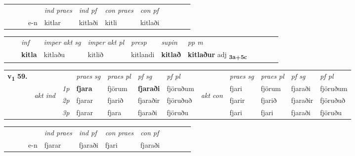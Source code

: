\begin{tabular}{llllllllllll}
 & &  & &  \textit{ind praes} & \textit{ind pf} & \textit{con praes} & \textit{con pf} \\*
&  & & e-n & kitlar & kitlaði & kitli & kitlaði \\*
\cmidrule{5-9}
\end{tabular}


\begin{tabular}{llllllllllll}
 & & \textit{inf} & \textit{imper akt sg} & \textit{imper akt pl}   & \textit{presp} & \textit{supin}  & \textit{pp m}     \\*
  & & \textbf{kitla} & kitlaðu  & kitlið   & kitlandi &  \textbf{kitlað}  & \textbf{kitlaður} adj \textbf{\textsubscript{3a+5c}} \\*
\cmidrule{1-12}
\end{tabular}



\begin{tabular}{llllllllllll} \toprule
\multirow{4}{*}{{{\textbf{v{\textsubscript{1}}} \Large{\textbf{59.}}}}}  & &   &  \textit{praes sg}  & \textit{praes pl}  &\textit{ pf sg} & \textit{pf pl} &  &  \textit{praes sg}  & \textit{praes pl}  & \textit{pf sg} & \textit{pf pl } \\*
	\cmidrule{4-7} \cmidrule{9-12}
 & \multirow{3}{*}{\begin{turn}{90}\textit{akt ind}\end{turn}} & {\textit{1p}} & \textbf{fjara} & fjörum    & \textbf{fjaraði} & fjöruðum & \multirow{3}{*}{\begin{turn}{90}\textit{akt con}\end{turn}} &fjari & fjörum & fjaraði & fjöruðum\\*
& &  {\textit{2p}} &  fjarar  & fjarið   & fjaraðir & fjöruðuð & & fjarir & fjarið & fjaraðir & fjöruðuð \\*
& &  {\textit{3p}} & fjarar & fjara   & fjaraði & fjöruðu & & fjari & fjari& fjaraði & fjöruðu  \\*
\cmidrule{4-7} \cmidrule{9-12}
\end{tabular}


\begin{tabular}{llllllllllll}
 & &  & &  \textit{ind praes} & \textit{ind pf} & \textit{con praes} & \textit{con pf} \\*
&  & & e-n & fjarar & fjaraði & fjari & fjaraði \\*
\cmidrule{5-9}
\end{tabular}


